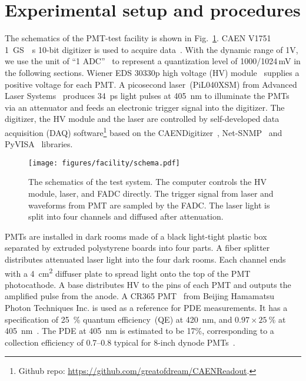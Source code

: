 \section{Experimental setup and procedures}
\label{SetUp}
The schematics of the PMT-test facility is shown in Fig.~\ref{fig:facility}. CAEN V1751 \SI{1}{GS \per s} 10-bit digitizer is used to acquire data~\cite{CAENV1751}. With the dynamic range of 1V, we use the unit of ``1 ADC''~\cite{JUNOPrototype} to represent a quantization level of 1000/1024\,mV in the following sections. Wiener EDS 30330p high voltage (HV) module~\cite{WIENERHV} supplies a positive voltage for each PMT. A picosecond laser~(PiL040XSM) from Advanced Laser Systems~\cite{NTKLaser} produces \SI{34}{ps} light pulses at \SI{405}{nm} to illuminate the PMTs via an attenuator and feeds an electronic trigger signal into the digitizer. The digitizer, the HV module and the laser are controlled by self-developed data acquisition (DAQ) software\footnote{Github repo: \url{https://github.com/greatofdream/CAENReadout}.} based on the CAENDigitizer~\cite{CAENLIB}, Net-SNMP~\cite{SNMP} and PyVISA~\cite{VISA} libraries.

\begin{figure}[!htbp]
    \centering
    \texttt{[image: figures/facility/schema.pdf]}
    \caption{The schematics of the test system. The computer controls the HV module, laser, and FADC directly. The trigger signal from laser and waveforms from PMT are sampled by the FADC. The laser light is split into four channels and diffused after attenuation.}
    \label{fig:facility}
\end{figure}

PMTs are installed in dark rooms made of a black light-tight plastic box separated by extruded polystyrene boards into four parts. A fiber splitter distributes attenuated laser light into the four dark rooms. Each channel ends with a \SI{4}{cm\tothe{2}} diffuser plate to spread light onto the top of the PMT photocathode.
A base distributes HV to the pins of each PMT and outputs the amplified pulse from the anode. A CR365 PMT~\cite{BJBS} from Beijing Hamamatsu Photon Techniques Inc. is used as a reference for PDE measurements.  It has a specification of \SI{25}{\percent} quantum efficiency~(QE) at \SI{420}{nm}, and \(0.97 \times \SI{25}{\percent}\) at \SI{405}{nm}~\cite{HAMAMATSUManual}. The PDE at \SI{405}{nm} is estimated to be 17\%, corresponding to a collection efficiency of 0.7--0.8 typical for 8-inch dynode PMTs~\cite{WANG2012113,R5912MOD,RCESpotlight}.

